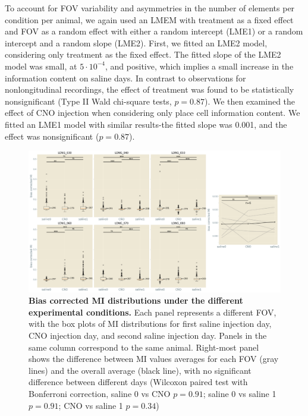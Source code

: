 To account for FOV variability and asymmetries in the number of elements per condition per animal, we again used an LMEM with treatment as a fixed effect and FOV as a random effect with either a random intercept (LME1) or a random intercept and a random slope (LME2).
First, we fitted an LME2 model, considering only treatment as the fixed effect.
The fitted slope of the LME2 model was small, at $5\cdot 10^{-4}$, and positive, which implies a small increase in the information content on saline days.
In contrast to observations for nonlongitudinal recordings, the effect of treatment was found to be statistically nonsignificant (Type II Wald chi-square tests, $p=0.87$).
We then examined the effect of CNO injection when considering only place cell information content. We fitted an LME1 model with similar results-the fitted slope was 0.001, and the effect was nonsignificant ($p=0.87$).
\begin{figure}[h]
    \centering
    \includegraphics[width=\textwidth]{Figures/Chapter4/MI_C_all_cells_longitudinal.pdf}
    \caption[Bias corrected MI distributions under the different experimental conditions]{\textbf{Bias corrected MI distributions under the different experimental conditions.} Each panel represents a different FOV, with the box plots of MI distributions for first saline injection day, CNO injection day, and second saline injection day. Panels in the same column correspond to the same animal. Right-most panel shows the difference between MI values averages for each FOV (gray lines) and the overall average (black line), with no significant difference between different days (Wilcoxon paired test with Bonferroni correction, saline 0 vs CNO $p=0.91$; saline 0 vs saline 1 $p=0.91$; CNO vs saline 1 $p=0.34$)}
    \label{fig:chap4:MI_C_all_cells_longitudinal}
\end{figure}


